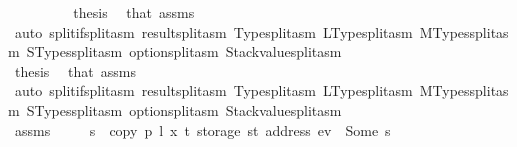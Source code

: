 \begin{isabellebody}
\ \ \ \ \ \ \isamarkupfalse%
\ \isamarkupfalse%
\ {\isacharquery}{\kern0pt}thesis\ \isamarkupfalse%
\ that{\isacharparenleft}{\kern0pt}{}{}{\isacharparenright}{\kern0pt}\ assms\ {}\isanewline
\ \ \ \ \ \ \ \ \isamarkupfalse%
\ {\isacharparenleft}{\kern0pt}auto\ split{\isacharcolon}{\kern0pt}if{\isacharunderscore}{\kern0pt}split{\isacharunderscore}{\kern0pt}asm\ result{\isachardot}{\kern0pt}split{\isacharunderscore}{\kern0pt}asm\ Type{\isachardot}{\kern0pt}split{\isacharunderscore}{\kern0pt}asm\ LType{\isachardot}{\kern0pt}split{\isacharunderscore}{\kern0pt}asm\ MTypes{\isachardot}{\kern0pt}split{\isacharunderscore}{\kern0pt}asm\ STypes{\isachardot}{\kern0pt}split{\isacharunderscore}{\kern0pt}asm\ option{\isachardot}{\kern0pt}split{\isacharunderscore}{\kern0pt}asm\ Stackvalue{\isachardot}{\kern0pt}split{\isacharunderscore}{\kern0pt}asm{\isacharparenright}{\kern0pt}\isanewline
\ \ \ \ \isamarkupfalse%
\isanewline
\ \ \ \ \ \ \isamarkupfalse%
\ {}{}\isanewline
\ \ \ \ \ \ \isamarkupfalse%
\ \isamarkupfalse%
\ {\isacharquery}{\kern0pt}thesis\ \isamarkupfalse%
\ that{\isacharparenleft}{\kern0pt}{}{}{\isacharparenright}{\kern0pt}\ assms\ {}\isanewline
\ \ \ \ \ \ \ \ \isamarkupfalse%
\ {\isacharparenleft}{\kern0pt}auto\ split{\isacharcolon}{\kern0pt}if{\isacharunderscore}{\kern0pt}split{\isacharunderscore}{\kern0pt}asm\ result{\isachardot}{\kern0pt}split{\isacharunderscore}{\kern0pt}asm\ Type{\isachardot}{\kern0pt}split{\isacharunderscore}{\kern0pt}asm\ LType{\isachardot}{\kern0pt}split{\isacharunderscore}{\kern0pt}asm\ MTypes{\isachardot}{\kern0pt}split{\isacharunderscore}{\kern0pt}asm\ STypes{\isachardot}{\kern0pt}split{\isacharunderscore}{\kern0pt}asm\ option{\isachardot}{\kern0pt}split{\isacharunderscore}{\kern0pt}asm\ Stackvalue{\isachardot}{\kern0pt}split{\isacharunderscore}{\kern0pt}asm{\isacharparenright}{\kern0pt}\isanewline
\ \ \ \ \isamarkupfalse%
\isanewline
\ \ \ \ \ \ \isamarkupfalse%
\ {}{}\isanewline
\ \ \ \ \ \ \isamarkupfalse%
\ \isamarkupfalse%
\ assms\ {}\ {}{}\ {}\ \isamarkupfalse%
\ s\ \ {\isachardoublequoteopen}copy\ p\ l\ x\ t\ {\isacharparenleft}{\kern0pt}storage\ st\ {\isacharparenleft}{\kern0pt}address\ ev{\isacharparenright}{\kern0pt}{\isacharparenright}{\kern0pt}\ {\isacharequal}{\kern0pt}\ Some\ s{\isachardoublequoteclose}\isanewline

\end{isabellebody}
